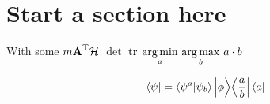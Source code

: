 \documentclass[12pt]{article}
\begin{document}
\section{Start a section here}

With some $m\textbf{A}^{{\rm T}}\mathcal{H}$ $\det$ ${\rm tr}$
$\underset{a}{\arg\min}~\underset{b}{\arg\max}~ a\cdot b$

\begin{equation}
\left\langle \psi\right| = \left\langle \psi^{a}\middle|\psi_{b}\right\rangle\left| \phi\middle\rangle\middle\langle\frac{a}{b}\right|\left\langle a\right|
\end{equation}
\end{document}
